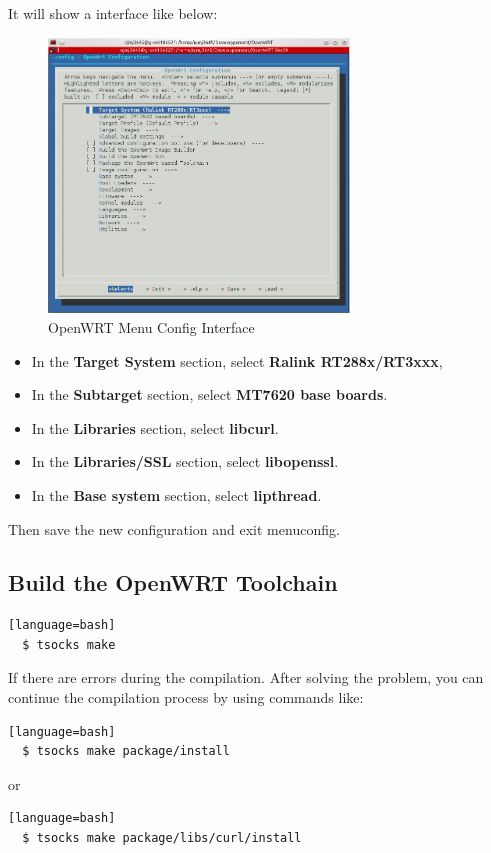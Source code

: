 It will show a interface like below:
\begin{figure}[htbp]
	\centering
		\includegraphics[width=8cm]{Figures/menuconfig.png}
	\caption[OpenWRT Menu Config Interface]{OpenWRT Menu Config Interface}
\end{figure}

\begin{itemize}
  \item In the \textbf{Target System} section, select \textbf{Ralink RT288x/RT3xxx},
  \item In the \textbf{Subtarget} section, select \textbf{MT7620 base boards}.
  \item In the \textbf{Libraries} section, select \textbf{libcurl}.
  \item In the \textbf{Libraries/SSL} section, select \textbf{libopenssl}.
  \item In the \textbf{Base system} section, select \textbf{lipthread}.
\end{itemize}

Then save the new configuration and exit menuconfig.


\subsection{Build the OpenWRT Toolchain}
\begin{lstlisting}[style=DOS][language=bash]
  $ tsocks make
\end{lstlisting}
If there are errors during the compilation. After solving the problem, you can continue the compilation process by using commands like:
\begin{lstlisting}[style=DOS][language=bash]
  $ tsocks make package/install
\end{lstlisting}
or
\begin{lstlisting}[style=DOS][language=bash]
  $ tsocks make package/libs/curl/install
\end{lstlisting}

